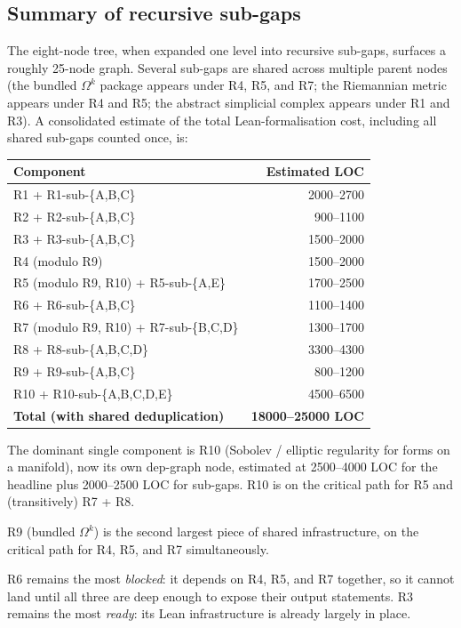 \subsection{Summary of recursive sub-gaps}
\label{subsec:gap-summary}

The eight-node tree, when expanded one level into recursive sub-gaps,
surfaces a roughly 25-node graph.  Several sub-gaps are shared
across multiple parent nodes (the bundled \(\Omega^k\) package
appears under R4, R5, and R7; the Riemannian metric appears under R4
and R5; the abstract simplicial complex appears under R1 and R3).
A consolidated estimate of the total Lean-formalisation cost,
including all shared sub-gaps counted once, is:

\begin{center}
\begin{tabular}{lr}
\textbf{Component} & \textbf{Estimated LOC} \\\hline
R1 + R1-sub-\{A,B,C\} & 2000--2700 \\
R2 + R2-sub-\{A,B,C\} & 900--1100 \\
R3 + R3-sub-\{A,B,C\} & 1500--2000 \\
R4 (modulo R9) & 1500--2000 \\
R5 (modulo R9, R10) + R5-sub-\{A,E\} & 1700--2500 \\
R6 + R6-sub-\{A,B,C\} & 1100--1400 \\
R7 (modulo R9, R10) + R7-sub-\{B,C,D\} & 1300--1700 \\
R8 + R8-sub-\{A,B,C,D\} & 3300--4300 \\
R9 + R9-sub-\{A,B,C\} & 800--1200 \\
R10 + R10-sub-\{A,B,C,D,E\} & 4500--6500 \\\hline
\textbf{Total (with shared deduplication)} & \textbf{18000--25000 LOC} \\
\end{tabular}
\end{center}

The dominant single component is R10 (Sobolev / elliptic regularity for
forms on a manifold), now its own dep-graph node, estimated at
2500--4000 LOC for the headline plus 2000--2500 LOC for sub-gaps.
R10 is on the critical path for R5 and (transitively) R7 + R8.

R9 (bundled \(\Omega^{k}\)) is the second largest piece of shared
infrastructure, on the critical path for R4, R5, and R7 simultaneously.

R6 remains the most \emph{blocked}: it depends on R4, R5, and R7
together, so it cannot land until all three are deep enough to expose
their output statements.  R3 remains the most \emph{ready}: its Lean
infrastructure is already largely in place.

